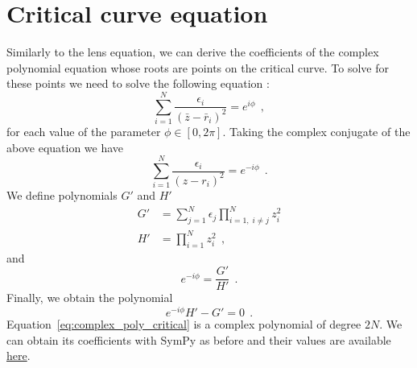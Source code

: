 \documentclass[12pt,dvipsnames]{report}
\newcommand{\ssf}[1]{\textsf{#1}}
\newcommand{\hquad}{~~}
\begin{document}
\section{Critical curve equation}
\label{app:complex_poly_crit}
Similarly to the lens equation, we can derive the coefficients of the complex
polynomial equation whose roots are points on the critical curve. To solve for
these points we need to solve the following equation
\citep{1990A&A...236..311W}:
\begin{equation}
    \sum_{i=1}^{N} \frac{\epsilon_{i}}{\left(\bar{z}-\bar{r}_{i}\right)^{2}}=e^{i \phi}
    \hquad,
\end{equation}
for each value of the parameter $\phi\in[0,2\pi]$.
Taking the complex conjugate of the above equation we have
\begin{equation}
    \sum_{i=1}^{N} \frac{\epsilon_{i}}{\left(z-r_{i}\right)^{2}}=e^{-i \phi}
    \hquad.
\end{equation}
We define polynomials $G'$ and $H'$
\begin{align}
    G' & = \sum_{j=1}^N\epsilon_j\prod_{i=1,\;i\neq j}^Nz^2_i \\
    H' & = \prod_{i=1}^Nz^2_i
    \hquad,
\end{align}
and
\begin{equation}
    e^{-i\phi}=\frac{G'}{H'}
    \hquad.
\end{equation}
Finally, we obtain the polynomial
\begin{equation}
    e^{-i\phi}H' - G' = 0
    \hquad.
    \label{eq:complex_poly_critical}
\end{equation}
Equation~\ref{eq:complex_poly_critical} is a complex polynomial of degree $2N$. We can
obtain its coefficients with \ssf{SymPy} as before and their values are available
\href{https://github.com/fbartolic/caustics/blob/main/notebooks/ComplexPolynomialCoefficients.ipynb}{here}.
\end{document}
